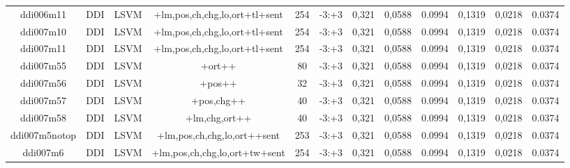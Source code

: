 \documentclass[a4paper]{article}
\begin{document}
\begin{landscape}
\begin{center}
\begin{tabular}{ |c|c|c|c|c|c|c|c|c|c|c|c|}
 
 	
 	\small{ ddi006m11 } & \small{ DDI} & \small{  LSVM }  & +lm,pos,ch,chg,lo,ort+tl+sent  &  254 &  \small{  -3:+3 }  &  0,321 & 0,0588 & 0.0994  &  0,1319 & 0,0218 & 0.0374 \\
 	

 
 	
 	\small{ ddi007m10 } & \small{ DDI} & \small{  LSVM }  & +lm,pos,ch,chg,lo,ort+tl+sent  &  254 &  \small{  -3:+3 }  &  0,321 & 0,0588 & 0.0994  &  0,1319 & 0,0218 & 0.0374 \\
 	

 
 	
 	\small{ ddi007m11 } & \small{ DDI} & \small{  LSVM }  & +lm,pos,ch,chg,lo,ort+tl+sent  &  254 &  \small{  -3:+3 }  &  0,321 & 0,0588 & 0.0994  &  0,1319 & 0,0218 & 0.0374 \\
 	

 
 	
 	\small{ ddi007m55 } & \small{ DDI} & \small{  LSVM }  & +ort++  &  80 &  \small{  -3:+3 }  &  0,321 & 0,0588 & 0.0994  &  0,1319 & 0,0218 & 0.0374 \\
 	

 
 	
 	\small{ ddi007m56 } & \small{ DDI} & \small{  LSVM }  & +pos++  &  32 &  \small{  -3:+3 }  &  0,321 & 0,0588 & 0.0994  &  0,1319 & 0,0218 & 0.0374 \\
 	

 
 	
 	\small{ ddi007m57 } & \small{ DDI} & \small{  LSVM }  & +pos,chg++  &  40 &  \small{  -3:+3 }  &  0,321 & 0,0588 & 0.0994  &  0,1319 & 0,0218 & 0.0374 \\
 	

 
 	
 	\small{ ddi007m58 } & \small{ DDI} & \small{  LSVM }  & +lm,chg,ort++  &  40 &  \small{  -3:+3 }  &  0,321 & 0,0588 & 0.0994  &  0,1319 & 0,0218 & 0.0374 \\
 	

 
 	
 	\small{ ddi007m5notop } & \small{ DDI} & \small{  LSVM }  & +lm,pos,ch,chg,lo,ort++sent  &  253 &  \small{  -3:+3 }  &  0,321 & 0,0588 & 0.0994  &  0,1319 & 0,0218 & 0.0374 \\
 	

 
 	
 	\small{ ddi007m6 } & \small{ DDI} & \small{  LSVM }  & +lm,pos,ch,chg,lo,ort+tw+sent  &  254 &  \small{  -3:+3 }  &  0,321 & 0,0588 & 0.0994  &  0,1319 & 0,0218 & 0.0374 \\
 	


\end{tabular}
\end{center}
\end{landscape}
\end{document}

